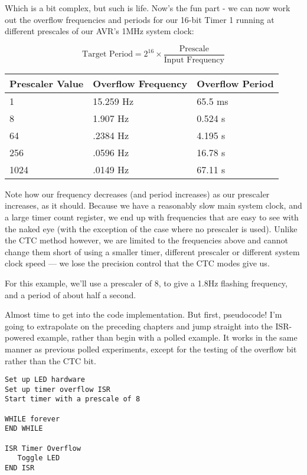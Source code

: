 \documentclass[a4paper,oneside,notitlepage]{book}
\begin{document}
Which is a bit complex, but such is life. Now's the fun part - we can now work out the overflow frequencies and periods for our 16-bit Timer 1 running at different prescales of our AVR's 1MHz system clock:

\begin{displaymath}
\text{Target Period} = 2^{16} \times \frac{\text{Prescale}}{\text{Input Frequency}}
\end{displaymath}

\begin{center}
\begin{tabular}{|l|l|l|}
	\hline
	Prescaler Value & Overflow Frequency & Overflow Period  \\
	\hline
	1    & 15.259 Hz & 65.5 ms \\
	8    & 1.907 Hz  & 0.524 s \\
	64   & .2384 Hz  & 4.195 s \\
	256  & .0596 Hz  & 16.78 s \\
	1024 & .0149 Hz  & 67.11 s \\
	\hline
\end{tabular}
\end{center}

Note how our frequency decreases (and period increases) as our prescaler increases, as it should. Because we have a reasonably slow main system clock, and a large timer count register, we end up with frequencies that are easy to see with the naked eye (with the exception of the case where no prescaler is used). Unlike the CTC method however, we are limited to the frequencies above and cannot change them short of using a smaller timer, different prescaler or different system clock speed --- we lose the precision control that the CTC modes give us.

For this example, we'll use a prescaler of 8, to give a 1.8Hz flashing frequency, and a period of about half a second.

Almost time to get into the code implementation. But first, pseudocode! I'm going to extrapolate on the preceding chapters and jump straight into the ISR-powered example, rather than begin with a polled example. It works in the same manner as previous polled experiments, except for the testing of the overflow bit rather than the CTC bit.

\begin{center}
\begin{lstlisting}[keywordstyle=\color{black},commentstyle=\color{black}]
Set up LED hardware
Set up timer overflow ISR
Start timer with a prescale of 8

WHILE forever
END WHILE

ISR Timer Overflow
   Toggle LED
END ISR
\end{lstlisting}
\end{center}
\end{document}
